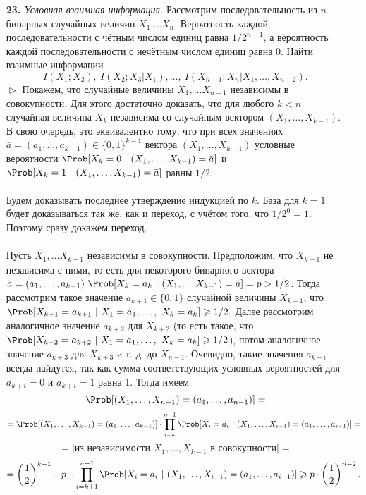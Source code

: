 \documentclass{article}
\renewcommand{\ge}{\geqslant}
\begin{document}
\begin{enumerate}
\item[\bfseries 23.] \textit{Условная взаимная информация.} Рассмотрим последовательность из $n$ бинарных случайных величин $X_1. \ldots X_n$. Вероятность каждой последовательности с чётным числом единиц равна $1/2^{n - 1}$, а вероятность каждой последовательности с нечётным числом единиц равна $0$. Найти взаимные информации $$I(X_1; X_2),\ I(X_2; X_3|X_1), \ldots,\ I(X_{n - 1}; X_n | X_1, \ldots, X_{n - 2}).$$
$\vartriangleright$  Покажем, что случайные величины $X_1, \ldots X_{n - 1}$ независимы в совокупности. Для этого достаточно доказать, что для любого $k < n$ случайная величина $X_k$ независима со случайным вектором $(X_1, \ldots, X_{k - 1})$. 
\\В свою очередь, это эквивалентно тому, что при всех значениях $\bar a = (a_1, \ldots, a_{k - 1}) \in \{0, 1\}^{k - 1}$ вектора $(X_1, \ldots, X_{k - 1})$ условные вероятности $\Prob[X_k = 0\ |\ (X_1, \ldots, X_{k - 1}) = \bar a]$ и $\Prob[X_k = 1\ |\ (X_1, \ldots, X_{k - 1}) = \bar a]$ равны $1/2$. 
\\\\Будем доказывать последнее утверждение индукцией по $k$. База для $k = 1$ будет доказываться так же, как и переход, с учётом того, что $1/2^0 = 1$. Поэтому сразу докажем переход. 
\\\\Пусть $X_1, \ldots X_{k - 1}$ независимы в совокупности. Предположим, что $X_{k + 1}$ не независима с ними, то есть для некоторого бинарного вектора $\bar a = (a_1, \ldots, a_{k - 1})\ \Prob[X_k = a_k\ |\ (X_1, \ldots X_{k - 1}) = \bar a] = p > 1/2$. Тогда рассмотрим такое значение $a_{k + 1} \in \{0, 1\}$ случайной величины $X_{k + 1}$, что $\Prob[X_{k + 1} = a_{k + 1}\ |\ X_1 = a_1, \ldots,\ X_k = a_k] \ge 1/2.$ Далее рассмотрим аналогичное значение $a_{k + 2}$ для $X_{k + 2}$ (то есть такое, что $\Prob[X_{k + 2} = a_{k + 2}\ |\ X_1 = a_1, \ldots,\ X_k = a_k] \ge 1/2$), потом аналогичное значение $a_{k + 3}$ для $X_{k + 3}$ и т. д. до $X_{n - 1}$. Очевидно, такие значения $a_{k + i}$ всегда найдутся, так как сумма соответствующих условных вероятностей для $a_{k + i} = 0$ и $a_{k + i} = 1$ равна 1. Тогда имеем
$$\Prob[(X_1, \ldots, X_{n - 1}) = (a_1, \ldots, a_{n - 1})] =$$
$$= \Prob[(X_1, \ldots, X_{k - 1}) = (a_1, \ldots, a_{k - 1})] \cdot \prod_{i = k}^{n - 1} \Prob[X_i = a_i\ |\ (X_1, \ldots, X_{i - 1}) = (a_1, \ldots, a_{i - 1})] =$$
\newpage
$$= |\text{из независимости $X_1, \ldots, X_{k - 1}$ в совокупности}| =$$
$$= \left(\frac{1}{2}\right)^{k - 1} \cdot\ p\ \cdot \prod_{i = k + 1}^{n - 1} \Prob[X_i = a_i\ |\ (X_1, \ldots, X_{i - 1}) = (a_1, \ldots, a_{i - 1})] \ge p \cdot \left(\frac{1}{2}\right)^{n - 2}.$$

\end{enumerate}
\end{document}

